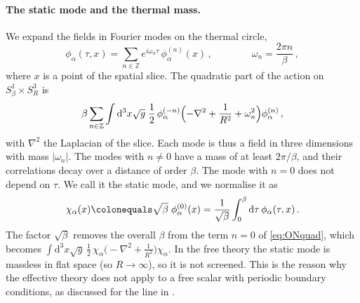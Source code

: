 \documentclass[a4paper,11pt]{article}
\newcommand{\dd}{\mathrm{d}}
\begin{document}
\paragraph{The static mode and the thermal mass.}
We expand the fields in Fourier modes on the thermal circle,
\begin{equation}\label{eq:ONmodes}
	\phi_\alpha(\tau,x)=\sum_{n\in\mathbb{Z}}e^{i\omega_n\tau}\,\phi^{(n)}_\alpha(x)\, ,\qquad\qquad \omega_n=\frac{2\pi n}{\beta}\, ,
\end{equation}
where $x$ is a point of the spatial slice. The quadratic part of the action on $S^1_\beta\times S^{3}_R$  is
\begin{equation}\label{eq:ONquad}
	\beta\sum_{n\in\mathbb{Z}}\int\dd^3x\sqrt g\;\frac12\,\phi^{(-n)}_\alpha\Bigl(-\nabla^2+\frac{1}{R^2}+\omega_n^2\Bigr)\phi^{(n)}_\alpha\, ,
\end{equation}
with $\nabla^2$ the Laplacian of the slice. Each mode is thus a field in three dimensions with mass $|\omega_n|$. The modes with $n\neq0$ have a mass of at least $2\pi/\beta$, and their correlations decay over a distance of order $\beta$. The mode with $n=0$ does not depend on $\tau$. We call it the static mode, and we normalise it as
\begin{equation}\label{eq:ONstatic}
	\chi_\alpha(x)\colonequals\sqrt\beta\;\phi^{(0)}_\alpha(x)=\frac{1}{\sqrt\beta}\int_0^\beta\dd\tau\,\phi_\alpha(\tau,x)\, .
\end{equation}
The factor $\sqrt\beta$ removes the overall $\beta$ from the term $n=0$ of \eqref{eq:ONquad}, which becomes $\int\dd^3x\sqrt g\,\tfrac12\,\chi_\alpha\bigl(-\nabla^2+\tfrac{1}{R^2}\bigr)\chi_\alpha$. In the free theory the static mode is massless in flat space (so $R \to \infty$), so it is not screened. This is the reason why the effective theory does not apply to a free scalar with periodic boundary conditions, as discussed for the line in \cite{BMP}.
\end{document}

